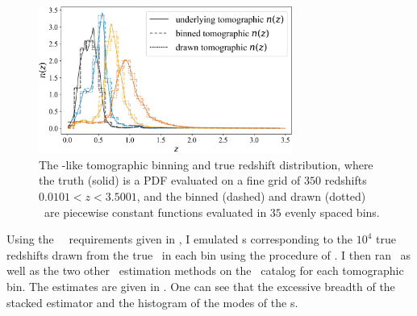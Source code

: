 \begin{figure}
	\begin{center}
		\includegraphics[width=0.74\textwidth]{figures/chippr/cosmolike_inputs.png}
		\caption{The \lsst-like tomographic binning and true redshift distribution, where the truth (solid) is a PDF evaluated on a fine grid of $350$ redshifts $0.0101 < z < 3.5001$, and the binned (dashed) and drawn (dotted) \nz\ are piecewise constant functions evaluated in $35$ evenly spaced bins.
		}
	\end{center}
\end{figure}

Using the \lsst\ \pz\ requirements given in , I emulated \pzpdf s corresponding to the $10^{4}$ true redshifts drawn from the true \nz\ in each bin using the procedure of .
I then ran \chippr\ as well as the two other \nz\ estimation methods on the \pzpdf\ catalog for each tomographic bin.
The estimates are given in .
One can see that the excessive breadth of the stacked estimator and the histogram of the modes of the \pzpdf s.

